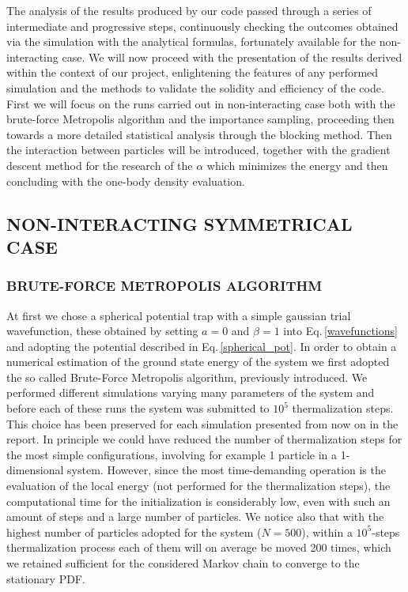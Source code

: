 The analysis of the results produced by our code passed through a series of intermediate and progressive steps, continuously checking the outcomes obtained via the simulation with the analytical formulas, fortunately available for the non-interacting case. We will now proceed with the presentation of the results derived within the context of our project, enlightening the features of any performed simulation and the methods to validate the solidity and efficiency of the code. First we will focus on the runs carried out in non-interacting case both with the brute-force Metropolis algorithm and the importance sampling, proceeding then towards a more detailed statistical analysis through the blocking method. Then the interaction between particles will be introduced, together with the gradient descent method for the research of the $\alpha$ which minimizes the energy and then concluding with the one-body density evaluation.


\subsection{NON-INTERACTING SYMMETRICAL CASE}
\subsubsection{BRUTE-FORCE METROPOLIS ALGORITHM}
At first we chose a spherical potential trap with a simple gaussian trial wavefunction, these obtained by setting $a=0$ and $\beta=1$ into Eq.\,\ref{wavefunctions} and adopting the potential described in Eq.\,\ref{spherical_pot}. In order to obtain a numerical estimation of the ground state energy of the system we first adopted the so called Brute-Force Metropolis algorithm, previously introduced. We performed different simulations varying many parameters of the system and before each of these runs the system was submitted to $10^5$ thermalization steps. This choice has been preserved for each simulation presented from now on in the report. In principle we could have reduced the number of thermalization steps for the most simple configurations, involving for example 1 particle in a 1-dimensional system. However, since the most time-demanding operation is the evaluation of the local energy (not performed for the thermalization steps), the computational time for the initialization is considerably low, even with such an amount of steps and a large number of particles. We notice also that with the highest number of particles adopted for the system ($N=500$), within a $10^5$-steps thermalization process each of them will on average be moved 200 times, which we retained sufficient for the considered Markov chain to converge to the stationary PDF. \\

